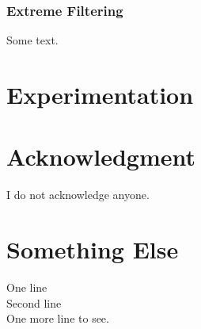 \documentclass[12pt, a4paper]{article}
\begin{document}
    \subsubsection{Extreme Filtering}
    Some text.
    
    \section{Experimentation}
    \kant[1]

    \section*{Acknowledgment} %
    \fontsize{8pt}{10pt}\selectfont I do not acknowledge anyone.

    \section{Something Else}
    \kant[1]
    \begin{center} %
        \begin{tiny}
            One line\\
            Second line\\
            One more line to see.\\
        \end{tiny}
    \end{center}
\end{document}
